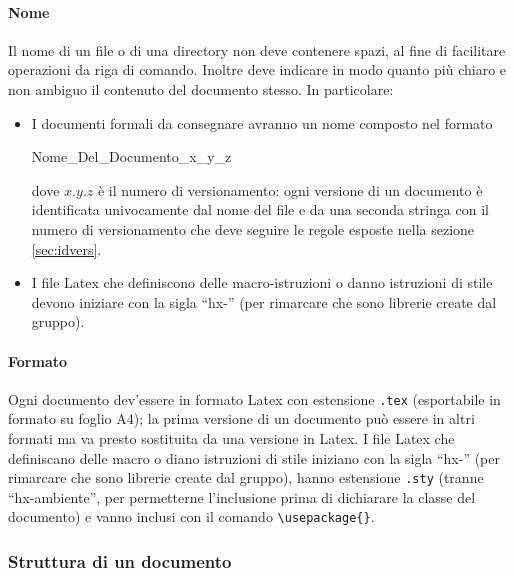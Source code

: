 \paragraph{Nome} Il nome di un file o di una directory non deve contenere spazi, al fine di facilitare operazioni da riga di comando. Inoltre deve indicare in modo quanto più chiaro e non ambiguo il contenuto del documento stesso. In particolare:
\begin{itemize}
	\item I documenti formali da consegnare avranno un nome composto nel formato
	\begin{center}
		Nome\_Del\_Documento\_x\_y\_z
	\end{center}
	dove $x.y.z$ è il numero di versionamento: ogni versione di un documento è identificata univocamente dal nome del file e da una seconda stringa con il numero di versionamento che deve seguire le regole esposte nella sezione \ref{sec:idvers}.
	\item I file Latex che definiscono delle macro-istruzioni o danno istruzioni di stile devono iniziare con la sigla “hx-” (per rimarcare che sono librerie create dal gruppo).
\end{itemize}
\paragraph{Formato} Ogni documento dev'essere in formato Latex con estensione \texttt{.tex} (esportabile in formato  su foglio A4); la prima versione di un documento può essere in altri formati ma va presto sostituita da una versione in Latex. I file Latex che definiscano delle macro o diano istruzioni di stile iniziano con la sigla “hx-” (per rimarcare che sono librerie create dal gruppo), hanno estensione \texttt{.sty} (tranne “hx-ambiente”, per permetterne l'inclusione prima di dichiarare la classe del documento) e vanno inclusi con il comando \texttt{\textbackslash usepackage\{\}}.

\subsubsection{Struttura di un documento}
